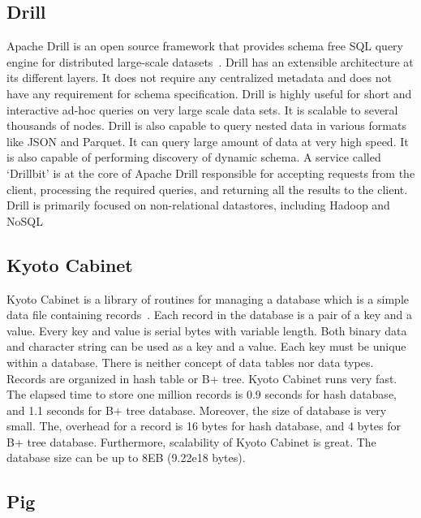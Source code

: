 \subsection{Drill}

Apache Drill is an open source framework that provides schema free SQL
query engine for distributed large-scale
datasets~\cite{www-ApacheDrill}. Drill has an extensible architecture
at its different layers. It does not require any centralized metadata
and does not have any requirement for schema specification. Drill is
highly useful for short and interactive ad-hoc queries on very large
scale data sets. It is scalable to several thousands of nodes. Drill
is also capable to query nested data in various formats like JSON and
Parquet. It can query large amount of data at very high speed. It is
also capable of performing discovery of dynamic schema.  A service
called ‘Drillbit’ is at the core of Apache Drill responsible for
accepting requests from the client, processing the required queries,
and returning all the results to the client.  Drill is primarily
focused on non-relational datastores, including Hadoop and NoSQL

     \pv

\subsection{Kyoto Cabinet}

Kyoto Cabinet is a library of routines for managing a database which
is a simple data file containing records~\cite{www-KyotoCabinet}.
Each record in the database is a pair of a key and a value. Every key
and value is serial bytes with variable length. Both binary data and
character string can be used as a key and a value. Each key must be
unique within a database.  There is neither concept of data tables nor
data types. Records are organized in hash table or B+ tree. Kyoto
Cabinet runs very fast. The elapsed time to store one million records
is 0.9 seconds for hash database, and 1.1 seconds for B+ tree
database. Moreover, the size of database is very small. The, overhead
for a record is 16 bytes for hash database, and 4 bytes for B+ tree
database. Furthermore, scalability of Kyoto Cabinet is great. The
database size can be up to 8EB (9.22e18 bytes).


     \pv

\subsection{Pig}

